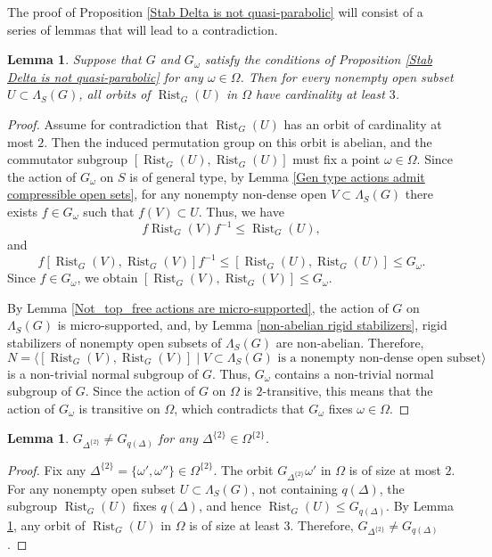 \documentclass[11pt,letterpaper]{article}
\renewcommand{\l}{\langle}
\renewcommand{\r}{\rangle}
\DeclareMathOperator{\rist}{Rist}
\newtheorem{lem}[thm]{Lemma}
\theoremstyle{definition}
\theoremstyle{remark}
\begin{document}
   The proof of Proposition \ref{Stab Delta is not quasi-parabolic} will consist of a series of lemmas that will lead to a contradiction.

\begin{lem}\label{orbits of rigid stabilizers of size 3} 
Suppose that $G$ and $G_\omega$ satisfy the conditions of Proposition \ref{Stab Delta is not quasi-parabolic} for any $\omega \in \Omega$. Then for every nonempty open subset $U \subset \Lambda_S(G)$, all orbits of $\rist_G(U)$ in $\Omega$ have cardinality at least $3$.
\end{lem}
\begin{proof}
    Assume for contradiction that $\rist_G(U)$ has an orbit of cardinality at most $2$. Then the induced permutation group on this orbit is abelian, and the commutator subgroup $[\rist_G(U), \rist_G(U)]$ must fix a point $\omega \in \Omega$. Since the action of $G_\omega$ on $S$ is of general type, by Lemma \ref{Gen type actions admit compressible open sets}, for any nonempty non-dense open $V \subset \Lambda_S(G)$ there exists $f \in G_\omega$ such that $f(V) \subset U$. Thus, we have 
    $$f \rist_G(V)f^{-1} \leq \rist_G(U),$$ and $$f[\rist_G(V),\rist_G(V)]f^{-1} \leq [\rist_G(U), \rist_G(U)] \leq G_\omega.$$
    Since $f \in G_\omega$, we obtain $[\rist_G(V),\rist_G(V)] \leq G_\omega$. 
    
    
    By Lemma \ref{Not_top_free actions are micro-supported}, the action of $G$ on $\Lambda_S(G)$ is micro-supported, and, by Lemma \ref{non-abelian rigid stabilizers}, rigid stabilizers of nonempty open subsets of $\Lambda_S(G)$ are non-abelian. Therefore, 
    $$
    N = \l [\rist_G(V),\rist_G(V)] \mid  V \subset \Lambda_S(G) \text{ is a nonempty non-dense open subset} \r
    $$ 
   is a non-trivial normal subgroup of $G$. Thus, $G_\omega$ contains a non-trivial normal subgroup of $G$. Since the action of $G$ on $\Omega$ is $2$-transitive, this means that the action of $G_\omega$ is transitive on $\Omega$, which contradicts that  $G_\omega$ fixes $\omega \in \Omega$.  
\end{proof}


\begin{lem}\label{the action of Stab is transitive on Omega}
  $G_{\Delta^{\{2\}}} \neq G_{q(\Delta)}$ for any $\Delta^{\{2\}} \in \Omega^{\{2\}}$.
\end{lem}
\begin{proof}
    Fix any $\Delta^{\{2\}}=\{\omega', \omega'' \} \in \Omega^{\{2\}}$. The orbit  $G_{\Delta^{\{2\}}}\omega'$ in $\Omega$ is of size at most $2$. For any nonempty open subset $U \subset \Lambda_S(G)$, not containing $q(\Delta)$, the subgroup $\rist_G(U)$ fixes $q(\Delta)$, and hence $\rist_G(U) \leq G_{q(\Delta)}$. By Lemma \ref{orbits of rigid stabilizers of size 3}, any orbit of $\rist_G(U)$ in $\Omega$ is of size at least $3$. Therefore, $G_{\Delta^{\{2\}}} \neq G_{q(\Delta)}$.
\end{proof}
\end{document}

